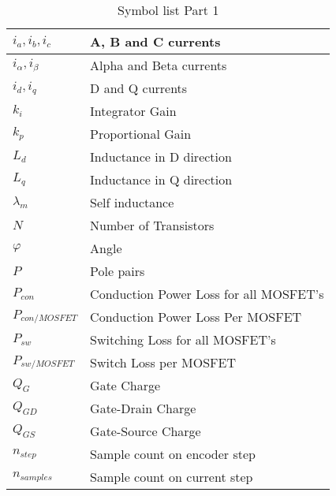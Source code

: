 \begin{table}[H]
\begin{tabular}{|l|l|}
$i_a,i_b,i_c$        & A, B and C currents                            \\ \hline
$i_\alpha, i_\beta$  & Alpha and Beta currents                        \\ \hline
$i_d, i_q$           & D and Q currents                               \\ \hline
$k_i$                & Integrator Gain                                \\ \hline
$k_p$                & Proportional Gain                              \\ \hline
$L_d$                & Inductance in D direction                      \\ \hline
$L_q$                & Inductance in Q direction                      \\ \hline
$\lambda _m$         & Self inductance                                \\ \hline
$N$                  & Number of Transistors                          \\ \hline
$\varphi$            & Angle                                          \\ \hline
$P$                  & Pole pairs                                     \\ \hline
$P_{con}$            & Conduction Power Loss for all MOSFET's         \\ \hline
$P_{con/MOSFET}$     & Conduction Power Loss Per MOSFET               \\ \hline
$P_{sw}$             & Switching Loss for all MOSFET's                \\ \hline
$P_{sw/MOSFET}$      & Switch Loss per MOSFET                         \\ \hline
$Q_{G}$              & Gate Charge                                    \\ \hline
$Q_{GD}$             & Gate-Drain Charge                              \\ \hline
$Q_{GS}$             & Gate-Source Charge                             \\ \hline
$n_{step}$           & Sample count on encoder step                   \\ \hline
$n_{samples}$        & Sample count on current step                   \\ \hline
\end{tabular}
\caption{Symbol list Part 1}
\label{Symbollist}
\end{table}


